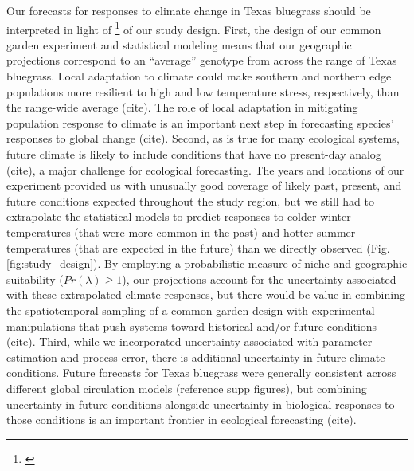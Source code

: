 \documentclass[12pt]{article}\usepackage[]{graphicx}\usepackage[dvipsnames]{xcolor}
\newcommand{\tom}[2]{{\color{red}{#1}}\footnote{\textit{\color{red}{#2}}}}
\begin{document}
Our forecasts for responses to climate change in Texas bluegrass should be interpreted in light of \tom{several features}{Something I thought about including here (but did not because of concern about length) is the fact that the model greatly overpredicts the GBIF occurrences. What do you think that means for our forecasts? WOuld this bias the forecast in one direction or another?} of our study design. 
First, the design of our common garden experiment and statistical modeling means that our geographic projections correspond to an ``average'' genotype from across the range of Texas bluegrass. 
Local adaptation to climate could make southern and northern edge populations more resilient to high and low temperature stress, respectively, than the range-wide average (cite). 
The role of local adaptation in mitigating population response to climate is an important next step in forecasting species' responses to global change (cite).
Second, as is true for many ecological systems, future climate is likely to include conditions that have no present-day analog (cite), a major challenge for ecological forecasting. 
The years and locations of our experiment provided us with unusually good coverage of likely past, present, and future conditions expected throughout the study region, but we still had to extrapolate the statistical models to predict responses to colder winter temperatures (that were more common in the past) and hotter summer temperatures (that are expected in the future) than we directly observed (Fig. \ref{fig:study_design}). 
By employing a probabilistic measure of niche and geographic suitability ($Pr(\lambda)\ge1$), our projections account for the uncertainty associated with these extrapolated climate responses, but there would be value in combining the spatiotemporal sampling of a common garden design with experimental manipulations that push systems toward historical and/or future conditions (cite). 
Third, while we incorporated uncertainty associated with parameter estimation and process error, there is additional uncertainty in future climate conditions. 
Future forecasts for Texas bluegrass were generally consistent across different global circulation models (reference supp figures), but combining uncertainty in future conditions alongside uncertainty in biological responses to those conditions is an important frontier in ecological forecasting (cite). 
\end{document}
